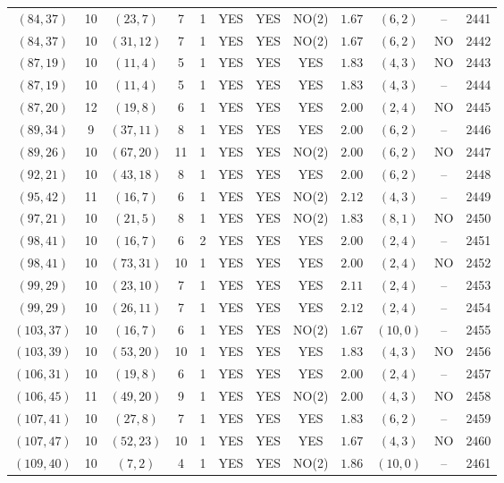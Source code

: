 \begin{longtable}{|c|c|c|c|c|c|c|c|c|c|c|c|}
$(84,37)$ & 10 & $(23,7)$ & 7 & 1 & YES & YES & NO(2) & $1.67$ & $(6,2)$ & -- & 2441\\
$(84,37)$ & 10 & $(31,12)$ & 7 & 1 & YES & YES & NO(2) & $1.67$ & $(6,2)$ & NO & 2442\\
$(87,19)$ & 10 & $(11,4)$ & 5 & 1 & YES & YES & YES & $1.83$ & $(4,3)$ & NO & 2443\\
$(87,19)$ & 10 & $(11,4)$ & 5 & 1 & YES & YES & YES & $1.83$ & $(4,3)$ & -- & 2444\\
$(87,20)$ & 12 & $(19,8)$ & 6 & 1 & YES & YES & YES & $2.00$ & $(2,4)$ & NO & 2445\\
$(89,34)$ & 9 & $(37,11)$ & 8 & 1 & YES & YES & YES & $2.00$ & $(6,2)$ & -- & 2446\\
$(89,26)$ & 10 & $(67,20)$ & 11 & 1 & YES & YES & NO(2) & $2.00$ & $(6,2)$ & NO & 2447\\
$(92,21)$ & 10 & $(43,18)$ & 8 & 1 & YES & YES & YES & $2.00$ & $(6,2)$ & -- & 2448\\
$(95,42)$ & 11 & $(16,7)$ & 6 & 1 & YES & YES & NO(2) & $2.12$ & $(4,3)$ & -- & 2449\\
$(97,21)$ & 10 & $(21,5)$ & 8 & 1 & YES & YES & NO(2) & $1.83$ & $(8,1)$ & NO & 2450\\
$(98,41)$ & 10 & $(16,7)$ & 6 & 2 & YES & YES & YES & $2.00$ & $(2,4)$ & -- & 2451\\
$(98,41)$ & 10 & $(73,31)$ & 10 & 1 & YES & YES & YES & $2.00$ & $(2,4)$ & NO & 2452\\
$(99,29)$ & 10 & $(23,10)$ & 7 & 1 & YES & YES & YES & $2.11$ & $(2,4)$ & -- & 2453\\
$(99,29)$ & 10 & $(26,11)$ & 7 & 1 & YES & YES & YES & $2.12$ & $(2,4)$ & -- & 2454\\
$(103,37)$ & 10 & $(16,7)$ & 6 & 1 & YES & YES & NO(2) & $1.67$ & $(10,0)$ & -- & 2455\\
$(103,39)$ & 10 & $(53,20)$ & 10 & 1 & YES & YES & YES & $1.83$ & $(4,3)$ & NO & 2456\\
$(106,31)$ & 10 & $(19,8)$ & 6 & 1 & YES & YES & YES & $2.00$ & $(2,4)$ & -- & 2457\\
$(106,45)$ & 11 & $(49,20)$ & 9 & 1 & YES & YES & NO(2) & $2.00$ & $(4,3)$ & NO & 2458\\
$(107,41)$ & 10 & $(27,8)$ & 7 & 1 & YES & YES & YES & $1.83$ & $(6,2)$ & -- & 2459\\
$(107,47)$ & 10 & $(52,23)$ & 10 & 1 & YES & YES & YES & $1.67$ & $(4,3)$ & NO & 2460\\
$(109,40)$ & 10 & $(7,2)$ & 4 & 1 & YES & YES & NO(2) & $1.86$ & $(10,0)$ & -- & 2461\\

\end{longtable}

